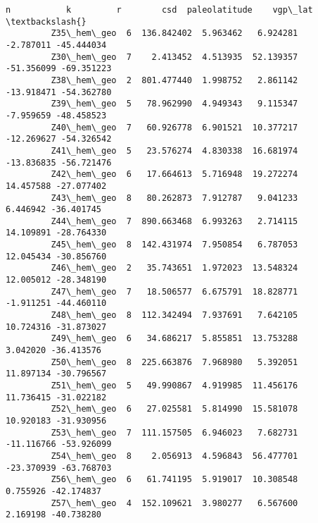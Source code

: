 \documentclass[11pt]{article}
\begin{document}
\begin{Verbatim}[commandchars=\\\{\}]
                      n           k         r        csd  paleolatitude    vgp\_lat  \textbackslash{}
         Z35\_hem\_geo  6  136.842402  5.963462   6.924281      -2.787011 -45.444034   
         Z30\_hem\_geo  7    2.413452  4.513935  52.139357     -51.356099 -69.351223   
         Z38\_hem\_geo  2  801.477440  1.998752   2.861142     -13.918471 -54.362780   
         Z39\_hem\_geo  5   78.962990  4.949343   9.115347      -7.959659 -48.458523   
         Z40\_hem\_geo  7   60.926778  6.901521  10.377217     -12.269627 -54.326542   
         Z41\_hem\_geo  5   23.576274  4.830338  16.681974     -13.836835 -56.721476   
         Z42\_hem\_geo  6   17.664613  5.716948  19.272274      14.457588 -27.077402   
         Z43\_hem\_geo  8   80.262873  7.912787   9.041233       6.446942 -36.401745   
         Z44\_hem\_geo  7  890.663468  6.993263   2.714115      14.109891 -28.764330   
         Z45\_hem\_geo  8  142.431974  7.950854   6.787053      12.045434 -30.856760   
         Z46\_hem\_geo  2   35.743651  1.972023  13.548324      12.005012 -28.348190   
         Z47\_hem\_geo  7   18.506577  6.675791  18.828771      -1.911251 -44.460110   
         Z48\_hem\_geo  8  112.342494  7.937691   7.642105      10.724316 -31.873027   
         Z49\_hem\_geo  6   34.686217  5.855851  13.753288       3.042020 -36.413576   
         Z50\_hem\_geo  8  225.663876  7.968980   5.392051      11.897134 -30.796567   
         Z51\_hem\_geo  5   49.990867  4.919985  11.456176      11.736415 -31.022182   
         Z52\_hem\_geo  6   27.025581  5.814990  15.581078      10.920183 -31.930956   
         Z53\_hem\_geo  7  111.157505  6.946023   7.682731     -11.116766 -53.926099   
         Z54\_hem\_geo  8    2.056913  4.596843  56.477701     -23.370939 -63.768703   
         Z56\_hem\_geo  6   61.741195  5.919017  10.308548       0.755926 -42.174837   
         Z57\_hem\_geo  4  152.109621  3.980277   6.567600       2.169198 -40.738280   
         

\end{Verbatim}
\end{document}
